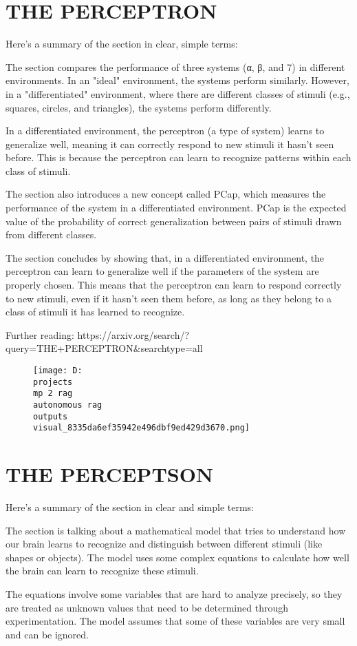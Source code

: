 \documentclass[12pt,a4paper]{article}
\begin{document}
\section{THE PERCEPTRON}
Here's a summary of the section in clear, simple terms:

The section compares the performance of three systems (α, β, and 7) in different environments. In an "ideal" environment, the systems perform similarly. However, in a "differentiated" environment, where there are different classes of stimuli (e.g., squares, circles, and triangles), the systems perform differently.

In a differentiated environment, the perceptron (a type of system) learns to generalize well, meaning it can correctly respond to new stimuli it hasn't seen before. This is because the perceptron can learn to recognize patterns within each class of stimuli.

The section also introduces a new concept called PCap, which measures the performance of the system in a differentiated environment. PCap is the expected value of the probability of correct generalization between pairs of stimuli drawn from different classes.

The section concludes by showing that, in a differentiated environment, the perceptron can learn to generalize well if the parameters of the system are properly chosen. This means that the perceptron can learn to respond correctly to new stimuli, even if it hasn't seen them before, as long as they belong to a class of stimuli it has learned to recognize.

Further reading: https://arxiv.org/search/?query=THE+PERCEPTRON&searchtype=all
\begin{figure}[h]
\centering
\texttt{[image: D:\\projects\\mp 2 rag\\autonomous rag\\outputs\\visual\_8335da6ef35942e496dbf9ed429d3670.png]}
\end{figure}
\section{THE PERCEPTSON}
Here's a summary of the section in clear and simple terms:

The section is talking about a mathematical model that tries to understand how our brain learns to recognize and distinguish between different stimuli (like shapes or objects). The model uses some complex equations to calculate how well the brain can learn to recognize these stimuli.

The equations involve some variables that are hard to analyze precisely, so they are treated as unknown values that need to be determined through experimentation. The model assumes that some of these variables are very small and can be ignored.
\end{document}
